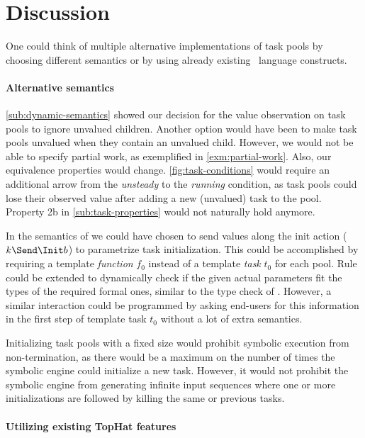 
\section{Discussion}
\label{sec:discussion}

One could think of multiple alternative implementations of task pools
by choosing different semantics or by using already existing \TOPHAT\ language constructs.

\paragraph{Alternative semantics}

\cref{sub:dynamic-semantics} showed our decision for the value observation on task pools to ignore unvalued children.
Another option would have been to make task pools unvalued when they contain an unvalued child.
However, we would not be able to specify partial work, as exemplified in \cref{exm:partial-work}.
Also, our equivalence properties would change.
\cref{fig:task-conditions} would require an additional arrow from the \emph{unsteady} to the \emph{running} condition,
as task pools could lose their observed value after adding a new (unvalued) task to the pool.
Property 2b in \cref{sub:task-properties} would not naturally hold anymore.

In the semantics of  we could have chosen to send values along the init action ($k \Send \Init b$) to parametrize task initialization.
This could be accomplished by requiring a template \emph{function} $f_0$ instead of a template \emph{task} $t_0$ for each pool.
Rule  could be extended to dynamically check if the given actual parameters fit the types of the required formal ones,
similar to the type check of .
However, a similar interaction could be programmed by asking end-users for this information in the first step of template task $t_0$
without a lot of extra semantics.

Initializing task pools with a fixed size would prohibit symbolic execution from non-termination,
as there would be a maximum on the number of times the symbolic engine could initialize a new task.
However, it would not prohibit the symbolic engine from generating infinite input sequences
where one or more initializations are followed by killing the same or previous tasks.

\paragraph{Utilizing existing TopHat features}

